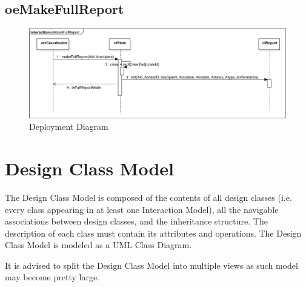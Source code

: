  \subsection{oeMakeFullReport}
 \begin{figure}[H]
	\begin{center}
	  \includegraphics[width=450px]{images/design/makeFull.eps}
	  \caption{Deployment Diagram}
	  \label{fig:deploy-diagram}
	\end{center}
\end{figure}
 
% 
% 



\section{Design Class Model}
The Design Class Model is composed of the contents of all design classes (i.e.
every class appearing in at least one Interaction Model), all the navigable associations between design
classes, and the inheritance structure. The description of each class must
contain its attributes and operations. The Design Class Model is modeled as a
UML Class Diagram. 

It is advised to split the Design Class Model into multiple views as such model
may become pretty large. 
	

% 
% 
% 
% 
% 
